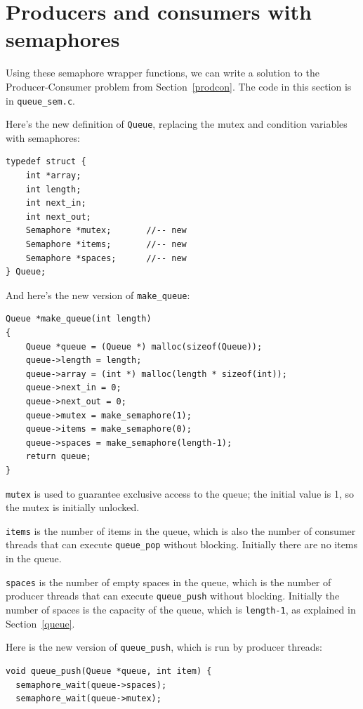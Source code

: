 \documentclass[12pt]{book}
\begin{document}
{\section{Producers and consumers with semaphores}

Using these semaphore wrapper functions, we can
write a solution to the Producer-Consumer problem from
Section~\ref{prodcon}.
The code in this section is in \verb"queue_sem.c".

Here's the new definition of {\tt Queue}, replacing the mutex
and condition variables with semaphores:

\begin{verbatim}
typedef struct {
    int *array;
    int length;
    int next_in;
    int next_out;
    Semaphore *mutex;       //-- new
    Semaphore *items;       //-- new
    Semaphore *spaces;      //-- new
} Queue;
\end{verbatim}

And here's the new version of \verb"make_queue":

\begin{verbatim}
Queue *make_queue(int length)
{
    Queue *queue = (Queue *) malloc(sizeof(Queue));
    queue->length = length;
    queue->array = (int *) malloc(length * sizeof(int));
    queue->next_in = 0;
    queue->next_out = 0;
    queue->mutex = make_semaphore(1);
    queue->items = make_semaphore(0);
    queue->spaces = make_semaphore(length-1);
    return queue;
}
\end{verbatim}

{\tt mutex} is used to guarantee exclusive access to the queue;
the initial value is 1, so the mutex is
initially unlocked.

{\tt items} is the number of items in the queue, which is also the number
of consumer threads that can execute \verb"queue_pop" without blocking.
Initially there are no items in the queue.

{\tt spaces} is the number of empty spaces in the queue, which is the
number of producer threads that can execute \verb"queue_push" without
blocking.  Initially the number of spaces is the capacity of the queue,
which is {\tt length-1}, as explained in Section~\ref{queue}.

Here is the new version of \verb"queue_push", which is run by
producer threads:

\begin{verbatim}
void queue_push(Queue *queue, int item) {
  semaphore_wait(queue->spaces);
  semaphore_wait(queue->mutex);


\end{verbatim}}
\end{document}
